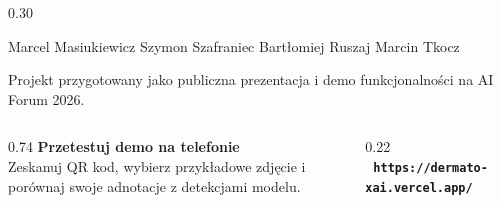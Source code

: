 \documentclass[final]{beamer}
\newcommand{\posterurl}{https://dermato-xai.vercel.app/}
\newcommand{\sectioncard}[2]{
  \begin{tcolorbox}[medicalcard,title={#1}]
    \justifying
    #2
  \end{tcolorbox}
}
\begin{document}
\begin{frame}[t]
\begin{columns}[T,totalwidth=\textwidth]
\begin{column}{0.30\textwidth}
    \sectioncard{Zespół}{
      Marcel Masiukiewicz \quad
      Szymon Szafraniec \quad
      Bartłomiej Ruszaj \quad
      Marcin Tkocz

      \vspace{0.5em}
      {\color{MutedTeal}Projekt przygotowany jako publiczna prezentacja i demo
      funkcjonalności na AI Forum 2026.}
    }
  \end{column}
\end{columns}

\vfill
\begin{tcolorbox}[
  enhanced,
  colback=PaleAqua,
  colframe=PaleAqua,
  arc=12mm,
  boxrule=0pt,
  width=\textwidth,
  left=16mm,
  right=16mm,
  top=8mm,
  bottom=8mm
]
  \begin{columns}[T,totalwidth=\textwidth]
    \begin{column}{0.74\textwidth}
      {\Large\bfseries\color{DeepTeal}Przetestuj demo na telefonie}\\
      {\color{MutedTeal}
      Zeskanuj QR kod, wybierz przykładowe zdjęcie i porównaj swoje adnotacje
      z detekcjami modelu.}
    \end{column}
    \begin{column}{0.22\textwidth}
      \RaggedLeft
      {\Large\bfseries\color{DarkTeal}\ \texttt{\posterurl}}
    \end{column}
  \end{columns}
\end{tcolorbox}

\end{frame}
\end{document}
